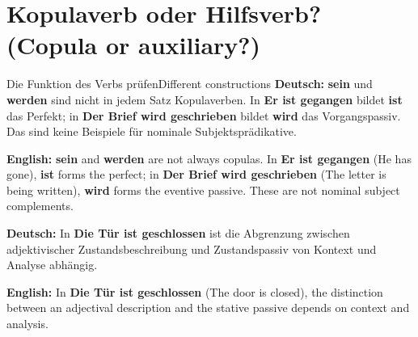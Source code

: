 \documentclass[a4paper,11pt]{article}
\newcommand{\GermanText}[1]{\textbf{Deutsch: }#1\par}
\newcommand{\EnglishText}[1]{{\small\color{SoftGray}\textbf{English: }#1\par}}
\begin{document}
\section{Kopulaverb oder Hilfsverb? \textnormal{(Copula or auxiliary?)}}
\begin{grammarentry}{Die Funktion des Verbs prüfen}{Different constructions}
\GermanText{\textbf{sein} und \textbf{werden} sind nicht in jedem Satz Kopulaverben. In \textbf{Er ist gegangen} bildet \textbf{ist} das Perfekt; in \textbf{Der Brief wird geschrieben} bildet \textbf{wird} das Vorgangspassiv. Das sind keine Beispiele für nominale Subjektsprädikative.}
\EnglishText{\textbf{sein} and \textbf{werden} are not always copulas. In \textbf{Er ist gegangen} (He has gone), \textbf{ist} forms the perfect; in \textbf{Der Brief wird geschrieben} (The letter is being written), \textbf{wird} forms the eventive passive. These are not nominal subject complements.}
\GermanText{In \textbf{Die Tür ist geschlossen} ist die Abgrenzung zwischen adjektivischer Zustandsbeschreibung und Zustandspassiv von Kontext und Analyse abhängig.}
\EnglishText{In \textbf{Die Tür ist geschlossen} (The door is closed), the distinction between an adjectival description and the stative passive depends on context and analysis.}
\end{grammarentry}
\end{document}
